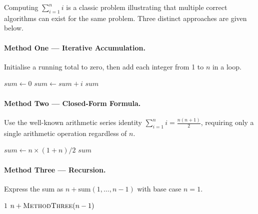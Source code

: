 \documentclass[11pt, a4paper, notitlepage]{report}
\theoremstyle{definition}
\theoremstyle{remark}
\theoremstyle{definition}
\begin{document}
Computing $\sum_{i=1}^{n} i$ is a classic problem illustrating that multiple correct algorithms
can exist for the same problem. Three distinct approaches are given below.

\paragraph{Method One --- Iterative Accumulation.}
Initialise a running total to zero, then add each integer from 1 to $n$ in a loop.

\begin{algorithm}[H]
\caption{Summing Arithmetic Sequence (Iterative)}
\label{alg:sum-iterative}
\begin{algorithmic}[1]
    \State $\textit{sum} \gets 0$
      \State $\textit{sum} \gets \textit{sum} + i$
    \EndFor
    \State \Return $\textit{sum}$
  \EndFunction
\end{algorithmic}
\end{algorithm}

\paragraph{Method Two --- Closed-Form Formula.}
Use the well-known arithmetic series identity $\sum_{i=1}^{n} i = \frac{n(n+1)}{2}$, requiring
only a single arithmetic operation regardless of $n$.

\begin{algorithm}[H]
\caption{Summing Arithmetic Sequence (Formula)}
\label{alg:sum-formula}
\begin{algorithmic}[1]
    \State $\textit{sum} \gets n \times (1 + n) / 2$
    \State \Return $\textit{sum}$
  \EndFunction
\end{algorithmic}
\end{algorithm}

\paragraph{Method Three --- Recursion.}
Express the sum as $n + \text{sum}(1,\ldots,n-1)$ with base case $n=1$.

\begin{algorithm}[H]
\caption{Summing Arithmetic Sequence (Recursive)}
\label{alg:sum-recursive}
\begin{algorithmic}[1]
      \State \Return $1$
    \Else
      \State \Return $n + \Call{MethodThree}{n-1}$
    \EndIf
  \EndFunction
\end{algorithmic}
\end{algorithm}
\end{document}
